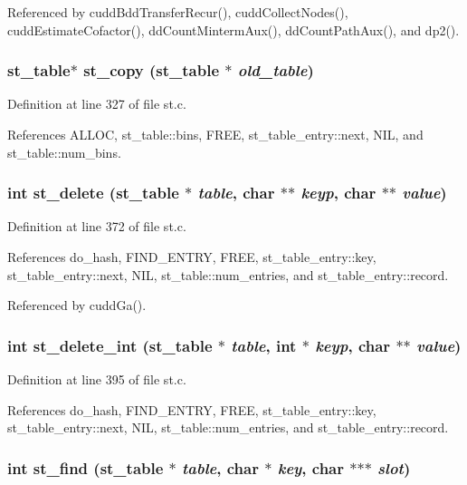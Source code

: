 Referenced by cudd\-Bdd\-Transfer\-Recur(), cudd\-Collect\-Nodes(), cudd\-Estimate\-Cofactor(), dd\-Count\-Minterm\-Aux(), dd\-Count\-Path\-Aux(), and dp2().
\subsubsection{\setlength{\rightskip}{0pt plus 5cm}\bf{st\_\-table}$\ast$ st\_\-copy (\bf{st\_\-table} $\ast$ {\em old\_\-table})}\label{st_8c_1fe53fe235ae6db0c7abe49413785363}




Definition at line 327 of file st.c.

References ALLOC, st\_\-table::bins, FREE, st\_\-table\_\-entry::next, NIL, and st\_\-table::num\_\-bins.
\subsubsection{\setlength{\rightskip}{0pt plus 5cm}int st\_\-delete (\bf{st\_\-table} $\ast$ {\em table}, char $\ast$$\ast$ {\em keyp}, char $\ast$$\ast$ {\em value})}\label{st_8c_45ee9bed192436dabfb6a52dbd754a15}




Definition at line 372 of file st.c.

References do\_\-hash, FIND\_\-ENTRY, FREE, st\_\-table\_\-entry::key, st\_\-table\_\-entry::next, NIL, st\_\-table::num\_\-entries, and st\_\-table\_\-entry::record.

Referenced by cudd\-Ga().
\subsubsection{\setlength{\rightskip}{0pt plus 5cm}int st\_\-delete\_\-int (\bf{st\_\-table} $\ast$ {\em table}, int $\ast$ {\em keyp}, char $\ast$$\ast$ {\em value})}\label{st_8c_d79d880ccd6e65ced48c04d0b165f30e}




Definition at line 395 of file st.c.

References do\_\-hash, FIND\_\-ENTRY, FREE, st\_\-table\_\-entry::key, st\_\-table\_\-entry::next, NIL, st\_\-table::num\_\-entries, and st\_\-table\_\-entry::record.
\subsubsection{\setlength{\rightskip}{0pt plus 5cm}int st\_\-find (\bf{st\_\-table} $\ast$ {\em table}, char $\ast$ {\em key}, char $\ast$$\ast$$\ast$ {\em slot})}\label{st_8c_c511f7f70bc7c3935ecc4d87ab40c797}




